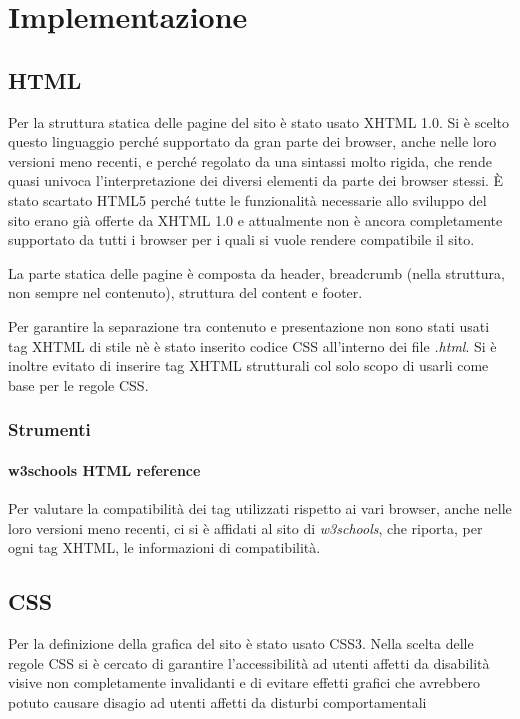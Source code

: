 \section{Implementazione}
\label{implementazione}

\subsection{HTML}
\label{implementazione-html}
Per la struttura statica delle pagine del sito è stato usato XHTML 1.0. Si è scelto questo linguaggio perché supportato da gran parte dei browser, anche nelle loro versioni meno recenti, e perché regolato da una sintassi molto rigida, che rende quasi univoca l'interpretazione dei diversi elementi da parte dei browser stessi. È stato scartato HTML5 perché tutte le funzionalità necessarie allo sviluppo del sito erano già offerte da XHTML 1.0 e attualmente non è ancora completamente supportato da tutti i browser per i quali si vuole rendere compatibile il sito.

La parte statica delle pagine è composta da header, breadcrumb (nella struttura, non sempre nel contenuto), struttura del content e footer.

Per garantire la separazione tra contenuto e presentazione non sono stati usati tag XHTML di stile nè è stato inserito codice CSS all'interno dei file \textit{.html}. Si è inoltre evitato di inserire tag XHTML strutturali col solo scopo di usarli come base per le regole CSS. 

\subsubsection{Strumenti}
\label{implementazione-html-strumenti}

\paragraph{w3schools HTML reference}
\label{implementazione-html-strumenti-w3schools-reference}
Per valutare la compatibilità dei tag utilizzati rispetto ai vari browser, anche nelle loro versioni meno recenti, ci si è affidati al sito di \textit{w3schools}, che riporta, per ogni tag XHTML, le informazioni di compatibilità.


\subsection{CSS}
\label{implementazione-css}
Per la definizione della grafica del sito è stato usato CSS3. Nella scelta delle regole CSS si è cercato di garantire l'accessibilità ad utenti affetti da disabilità visive non completamente invalidanti e di evitare effetti grafici che avrebbero potuto causare disagio ad utenti affetti da disturbi comportamentali

